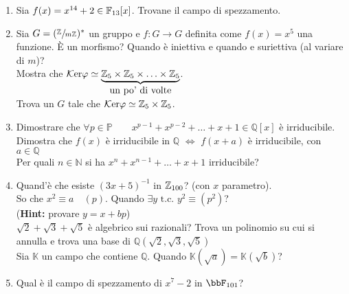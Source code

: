 \documentclass[a4paper,NoNotes]{stdmdoc}
\newcommand{\su}[2]{\sfrac{#1}{#2}}
\newcommand{\PP}{\mathbb{P}}
\newcommand{\QQ}{\mathbb{Q}}
\newcommand{\NN}{\mathbb{N}}
\newcommand{\KK}{\mathbb{K}}
\newcommand{\cart}{\times}
\newcommand{\tc}{\mbox{ t.c. }}
\newcommand{\Hint}{{\bf Hint: }}
\newcommand{\Ker}{\mathcal{K}\mbox{er} }
\begin{document}
\begin{enumerate}
		\item Sia $f(x) = x^{14}+2 \in \FF{13}[x]$. Trovane il campo di spezzamento.
		\item Sia $G = (\su{\ZZ{}}{m\ZZ{}})^*$ un gruppo e $f: G \rightarrow G$ definita come $f(x) = x^5$ una funzione. \`E un morfismo? Quando \`e iniettiva e quando e suriettiva (al variare di $m$)? \\ Mostra che $\Ker \varphi \simeq \underbrace{\ZZ{5}\cart\ZZ{5}\cart\ldots\cart\ZZ{5}}_{\mbox{un po' di volte}}$. \\ Trova un $G$ tale che $\Ker \varphi \simeq \ZZ{5}\cart\ZZ{5}$.
		\item Dimostrare che $\forall p \in \PP \qquad x^{p-1}+x^{p-2}+\ldots+x+1 \in \QQ[x]$ \`e irriducibile. Dimostra che $f(x)$ \`e irriducibile in $\QQ$ $\Leftrightarrow$ $f(x+a)$ \`e irriducibile, con $a \in \QQ$ \\ Per quali $n \in \NN$ si ha $x^n+x^{n-1}+\ldots+x+1$ irriducibile?
		\item Quand'\`e che esiste $(3x+5)^{-1}$ in $\ZZ{100}$? (con $x$ parametro). \\ So che $x^2 \equiv a \quad (p)$. Quando $\exists y \tc y^2 \equiv (p^2)$? \\ (\Hint provare $y=x+bp$) \\ $\sqrt{2}+\sqrt{3}+\sqrt{5}$ \`e algebrico sui razionali? Trova un polinomio su cui si annulla e trova una base di $\QQ(\sqrt{2}, \sqrt{3}, \sqrt{5})$ \\ Sia $\KK$ un campo che contiene $\QQ$. Quando $\KK(\sqrt{a}) = \KK(\sqrt{b})$?
		\item Qual è il campo di spezzamento di $x^7 - 2$ in $\bbF_{101}$?
	\end{enumerate}
\end{document}
